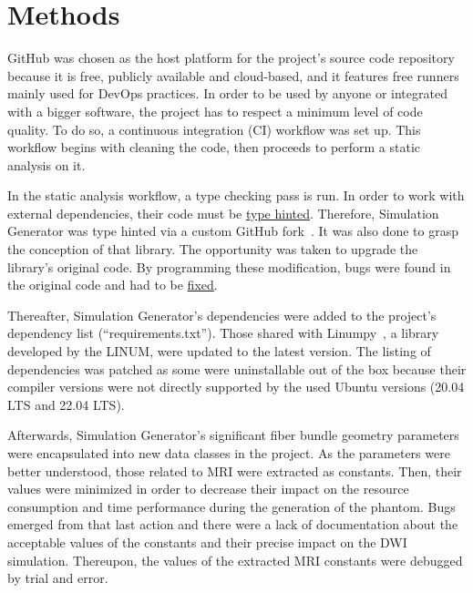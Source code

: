 \documentclass{article}
\begin{document}
  \section{Methods}\label{sec:methodology}

  GitHub was chosen as the host platform for the project's source code repository because it is free, publicly available and cloud-based, and it features free runners mainly used for DevOps practices.
  In order to be used by anyone or integrated with a bigger software, the project has to respect a minimum level of code quality.
  To do so, a continuous integration (CI) workflow was set up.
  This workflow begins with cleaning the code, then proceeds to perform a static analysis on it.

  In the static analysis workflow, a type checking pass is run.
  In order to work with external dependencies, their code must be \href{https://docs.python.org/3/library/typing.html}{type hinted}.
  Therefore, Simulation Generator was type hinted via a custom GitHub fork~\cite{dubreuil2022inm5803simgenfork, valcourtcaron2022simulationgenerator}.
  It was also done to grasp the conception of that library.
  The opportunity was taken to upgrade the library's original code.
  By programming these modification, bugs were found in the original code and had to be \href{https://github.com/benoit-dubreuil/voxsim/pulls?q=is\%3Apr+is\%3Aclosed}{fixed}.

  Thereafter, Simulation Generator's dependencies were added to the project's dependency list (``requirements.txt'').
  Those shared with Linumpy~\cite{linum2022linumpy}, a library developed by the LINUM, were updated to the latest version.
  The listing of dependencies was patched as some were uninstallable out of the box because their compiler versions were not directly supported by the used Ubuntu versions (20.04 LTS and 22.04 LTS).

  Afterwards, Simulation Generator's significant fiber bundle geometry parameters were encapsulated into new data classes in the project.
  As the parameters were better understood, those related to MRI were extracted as constants.
  Then, their values were minimized in order to decrease their impact on the resource consumption and time performance during the generation of the phantom.
  Bugs emerged from that last action and there were a lack of documentation about the acceptable values of the constants and their precise impact on the DWI simulation.
  Thereupon, the values of the extracted MRI constants were debugged by trial and error.
\end{document}
